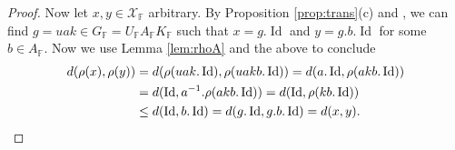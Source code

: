 \documentclass[12pt]{amsart}
\newcommand{\F}{\mathbb{F} }
\newcommand{\X}{\mathcal{X}}
\numberwithin{equation}{section}
\theoremstyle{remark} %
\begin{document}
\begin{proof}
	Now let $x,y \in \X_\F$ arbitrary. By Proposition \ref{prop:trans}(c) and \cite[Theorem \ref{I-thm:KAU}]{AppAGRCF}, we can find $g=uak\in G_\F = U_\F A_\F K_\F$ such that $x=g.\operatorname{Id}$ and $y=g.b.\operatorname{Id}$ for some $b \in A_\F$. Now we use Lemma \ref{lem:rhoA} and the above to conclude 
	\begin{align*}
		d(\rho(x),\rho(y)) &= d(\rho(uak.\operatorname{Id}), \rho(uakb.\operatorname{Id})) 
		= d(a.\operatorname{Id}, \rho(akb.\operatorname{Id})) \\
		&= d(\operatorname{Id}, a^{-1}.\rho(akb.\operatorname{Id})) 
		= d(\operatorname{Id}, \rho(kb.\operatorname{Id})) \\
		&\leq d(\operatorname{Id}, b.\operatorname{Id}) = d(g.\operatorname{Id}, g.b.\operatorname{Id}) = d(x,y). \qedhere
	\end{align*}
\end{proof}
\end{document}
